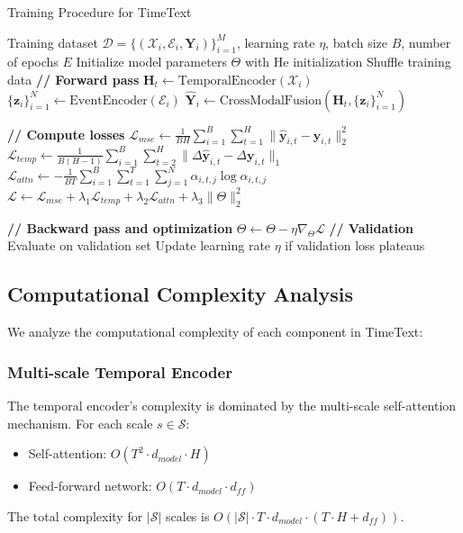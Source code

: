 \begin{algorithm}[t]
\caption{Training Procedure for TimeText}
\label{alg:training}
\begin{algorithmic}[1]
\Require Training dataset $\mathcal{D} = \{(\mathcal{X}_i, \mathcal{E}_i, \mathbf{Y}_i)\}_{i=1}^M$,
learning rate $\eta$, batch size $B$, number of epochs $E$
\State Initialize model parameters $\Theta$ with He initialization
    \State Shuffle training data
        \State \textbf{// Forward pass}
        \State $\mathbf{H}_t \gets \text{TemporalEncoder}(\mathcal{X}_i)$
        \State $\{\mathbf{z}_i\}_{i=1}^N \gets \text{EventEncoder}(\mathcal{E}_i)$
        \State $\hat{\mathbf{Y}}_i \gets \text{CrossModalFusion}(\mathbf{H}_t, \{\mathbf{z}_i\}_{i=1}^N)$
        
        \State \textbf{// Compute losses}
        \State $\mathcal{L}_{mse} \gets \frac{1}{BH}\sum_{i=1}^B \sum_{t=1}^H \|\hat{\mathbf{y}}_{i,t} - \mathbf{y}_{i,t}\|_2^2$
        \State $\mathcal{L}_{temp} \gets \frac{1}{B(H-1)}\sum_{i=1}^B \sum_{t=2}^H \|\Delta\hat{\mathbf{y}}_{i,t} - \Delta\mathbf{y}_{i,t}\|_1$
        \State $\mathcal{L}_{attn} \gets -\frac{1}{BT}\sum_{i=1}^B \sum_{t=1}^T \sum_{j=1}^N \alpha_{i,t,j} \log \alpha_{i,t,j}$
        \State $\mathcal{L} \gets \mathcal{L}_{mse} + \lambda_1\mathcal{L}_{temp} + \lambda_2\mathcal{L}_{attn} + \lambda_3\|\Theta\|_2^2$
        
        \State \textbf{// Backward pass and optimization}
        \State $\Theta \gets \Theta - \eta \nabla_\Theta \mathcal{L}$
    \EndFor
    \State \textbf{// Validation}
    \State Evaluate on validation set
    \State Update learning rate $\eta$ if validation loss plateaus
\EndFor
\end{algorithmic}
\end{algorithm}

\subsection{Computational Complexity Analysis}
We analyze the computational complexity of each component in TimeText:

\subsubsection{Multi-scale Temporal Encoder}
The temporal encoder's complexity is dominated by the multi-scale self-attention mechanism. For each scale $s \in \mathcal{S}$:
\begin{itemize}
    \item Self-attention: $O(T^2 \cdot d_{model} \cdot H)$
    \item Feed-forward network: $O(T \cdot d_{model} \cdot d_{ff})$
\end{itemize}
The total complexity for $|\mathcal{S}|$ scales is $O(|\mathcal{S}| \cdot T \cdot d_{model} \cdot (T \cdot H + d_{ff}))$.

